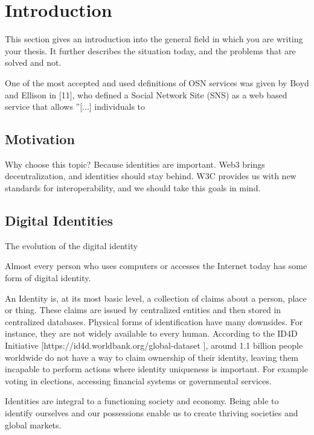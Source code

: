 \chapter{Introduction}
\label{cha:introduction}

This section gives an introduction into the general field in which you are writing your thesis. It further describes the situation today, and the problems that are solved and not.
 
One of the most accepted and used definitions of OSN services was given by Boyd and Ellison in [11], who defined a Social Network Site (SNS) as a web based service that allows ”[...] individuals to

\section{Motivation}
Why choose this topic? Because identities are important.
Web3 brings decentralization, and identities should stay behind. W3C provides us with new standards for interoperability, and we should take this goals in mind. 
 
 
\section{Digital Identities}
The evolution of the digital identity 
 
Almost every person who uses computers or accesses the Internet today has some form of digital identity. 
 
 
An Identity is, at its most basic level, a collection of claims about a person, place or thing. These claims are issued by centralized entities and then stored in centralized databases. Physical forms of identification have many downsides. For instance, they are not widely available to every human. According to the ID4D Initiative [https://id4d.worldbank.org/global-dataset ], around 1.1 billion people worldwide do not have a way to claim ownership of their identity, leaving them incapable to perform actions where identity uniqueness is important. For example voting in elections, accessing financial systems or governmental services. 
 
Identities are integral to a functioning society and economy. Being able to identify ourselves and our possessions enable us to create thriving societies and global markets. 
 
